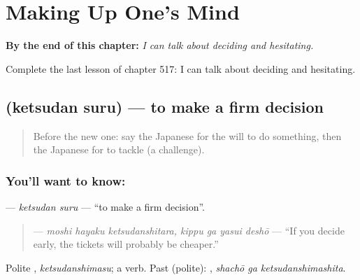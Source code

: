
\chapter{Making Up One's Mind}
\label{ch:ja-making-up-one-s-mind}

\begin{chapteropening}
\textbf{By the end of this chapter:} \emph{I can talk about deciding and hesitating.}

Complete the last lesson of chapter 517: I can talk about deciding and hesitating.
\end{chapteropening}

\section[\texorpdfstring{\ja{けつだんする} (ketsudan suru)}{けつだんする (ketsudan suru)}]{ (ketsudan suru) — to make a firm decision}

\label{lesson:JA-C517-ketsudan-suru}



\begin{quote}
Before the new one: say the Japanese for the will to do something, then the Japanese for to tackle (a challenge).
\end{quote}

\subsection*{You'll want to know: }
\textbf{} — \emph{ketsudan suru} — \textquotedblleft{}to make a firm decision\textquotedblright{}.

\begin{quote}
\textbf{   } — \emph{moshi hayaku ketsudanshitara, kippu ga yasui deshō} — \textquotedblleft{}If you decide early, the tickets will probably be cheaper.\textquotedblright{}
\end{quote}

Polite \textbf{}, \emph{ketsudanshimasu}; a  verb. Past (polite): \textbf{ }, \emph{shachō ga ketsudanshimashita}.

